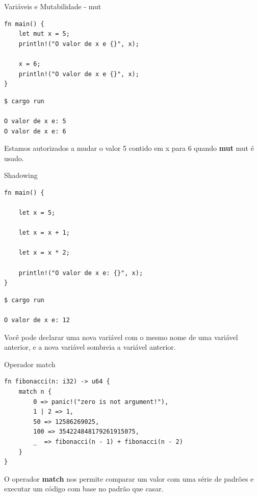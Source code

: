 \begin{frame}[fragile]{Variáveis e Mutabilidade - mut}
\lstset{language=Rust, style=boxed}
\begin{lstlisting}
fn main() {
    let mut x = 5;
    println!("O valor de x e {}", x);
    
    x = 6;
    println!("O valor de x e {}", x);
}
\end{lstlisting}

\begin{lstlisting}
$ cargo run

O valor de x e: 5
O valor de x e: 6
\end{lstlisting}

\small{Estamos autorizados a mudar o valor 5 contido em x para 6 quando \textbf{mut} mut é usado. }
\end{frame}

\begin{frame}[fragile]{Shadowing}
\lstset{language=Rust, style=boxed}
\begin{lstlisting}
fn main() {

    let x = 5;
    
    let x = x + 1;
    
    let x = x * 2;

    println!("O valor de x e: {}", x);
}
\end{lstlisting}

\begin{lstlisting}
$ cargo run

O valor de x e: 12
\end{lstlisting}
\small{Você pode declarar uma nova variável com o mesmo nome de uma variável anterior, e a nova variável sombreia a variável anterior.}
\end{frame}

\begin{frame}[fragile]{Operador match}
\lstset{language=Rust, style=boxed}
\begin{lstlisting}
fn fibonacci(n: i32) -> u64 {
    match n {
        0 => panic!("zero is not argument!"),
        1 | 2 => 1,
        50 => 12586269025,
        100 => 354224848179261915075,
        _  => fibonacci(n - 1) + fibonacci(n - 2)
    }
}
\end{lstlisting}
\small{O operador \textbf{match} nos permite comparar um valor com uma série de padrões e executar um código com base no padrão que casar.}
\end{frame}

